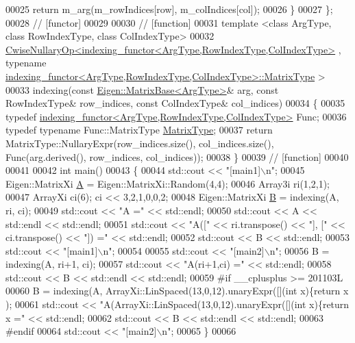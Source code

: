 \begin{DoxyCode}
00025     \textcolor{keywordflow}{return} m\_arg(m\_rowIndices[row], m\_colIndices[col]);
00026   \}
00027 \};
00028 \textcolor{comment}{// [functor]}
00029 
00030 \textcolor{comment}{// [function]}
00031 \textcolor{keyword}{template} <\textcolor{keyword}{class} ArgType, \textcolor{keyword}{class} RowIndexType, \textcolor{keyword}{class} ColIndexType>
00032 \hyperlink{group___core___module_class_eigen_1_1_cwise_nullary_op}{CwiseNullaryOp<indexing\_functor<ArgType,RowIndexType,ColIndexType>}
      , \textcolor{keyword}{typename} \hyperlink{group___core___module_class_eigen_1_1_matrix}{indexing\_functor<ArgType,RowIndexType,ColIndexType>::MatrixType}
      >
00033 indexing(\textcolor{keyword}{const} \hyperlink{group___core___module_class_eigen_1_1_matrix_base}{Eigen::MatrixBase<ArgType>}& arg, \textcolor{keyword}{const} RowIndexType& row\_indices, \textcolor{keyword}{
      const} ColIndexType& col\_indices)
00034 \{
00035   \textcolor{keyword}{typedef} \hyperlink{classindexing__functor}{indexing\_functor<ArgType,RowIndexType,ColIndexType>}
       Func;
00036   \textcolor{keyword}{typedef} \textcolor{keyword}{typename} Func::MatrixType \hyperlink{group___core___module_class_eigen_1_1_matrix}{MatrixType};
00037   \textcolor{keywordflow}{return} MatrixType::NullaryExpr(row\_indices.size(), col\_indices.size(), Func(arg.derived(), row\_indices, 
      col\_indices));
00038 \}
00039 \textcolor{comment}{// [function]}
00040 
00041 
00042 \textcolor{keywordtype}{int} main()
00043 \{
00044   std::cout << \textcolor{stringliteral}{"[main1]\(\backslash\)n"};
00045   Eigen::MatrixXi \hyperlink{group___core___module_class_eigen_1_1_matrix}{A} = Eigen::MatrixXi::Random(4,4);
00046   Array3i ri(1,2,1);
00047   ArrayXi ci(6); ci << 3,2,1,0,0,2;
00048   Eigen::MatrixXi \hyperlink{group___core___module_class_eigen_1_1_matrix}{B} = indexing(A, ri, ci);
00049   std::cout << \textcolor{stringliteral}{"A ="} << std::endl;
00050   std::cout << A << std::endl << std::endl;
00051   std::cout << \textcolor{stringliteral}{"A(["} << ri.transpose() << \textcolor{stringliteral}{"], ["} << ci.transpose() << \textcolor{stringliteral}{"]) ="} << std::endl;
00052   std::cout << B << std::endl;
00053   std::cout << \textcolor{stringliteral}{"[main1]\(\backslash\)n"};
00054 
00055   std::cout << \textcolor{stringliteral}{"[main2]\(\backslash\)n"};
00056   B =  indexing(A, ri+1, ci);
00057   std::cout << \textcolor{stringliteral}{"A(ri+1,ci) ="} << std::endl;
00058   std::cout << B << std::endl << std::endl;
00059 \textcolor{preprocessor}{#if \_\_cplusplus >= 201103L}
00060   B =  indexing(A, ArrayXi::LinSpaced(13,0,12).unaryExpr([](\textcolor{keywordtype}{int} x)\{\textcolor{keywordflow}{return} x%
      );
00061   std::cout << \textcolor{stringliteral}{"A(ArrayXi::LinSpaced(13,0,12).unaryExpr([](int x)\{return x%
       ="} << std::endl;
00062   std::cout << B << std::endl << std::endl;
00063 \textcolor{preprocessor}{#endif}
00064   std::cout << \textcolor{stringliteral}{"[main2]\(\backslash\)n"};
00065 \}
00066 
\end{DoxyCode}
